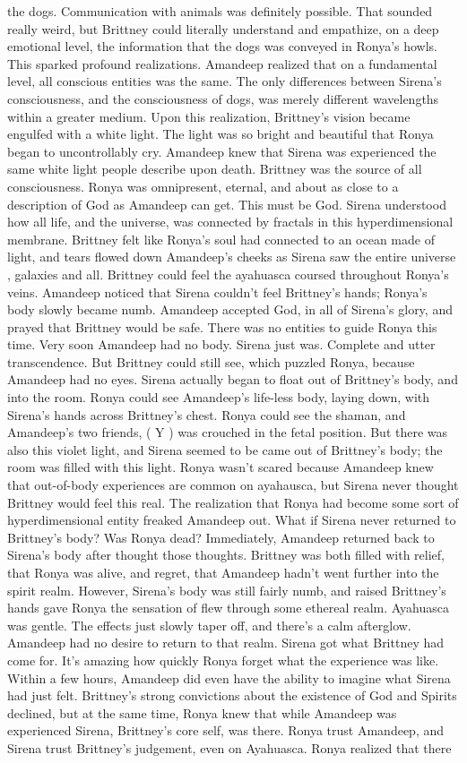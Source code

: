 \documentclass[12pt]{book}
\begin{document}
the dogs. Communication with animals was definitely possible. That sounded really weird, but Brittney could literally understand and empathize, on a deep emotional level, the information that the dogs was conveyed in Ronya's howls. This sparked profound realizations. Amandeep realized that on a fundamental level, all conscious entities was the same. The only differences between Sirena's consciousness, and the consciousness of dogs, was merely different wavelengths within a greater medium. Upon this realization, Brittney's vision became engulfed with a white light. The light was so bright and beautiful that Ronya began to uncontrollably cry. Amandeep knew that Sirena was experienced the same white light people describe upon death. Brittney was the source of all consciousness. Ronya was omnipresent, eternal, and about as close to a description of God as Amandeep can get. This must be God. Sirena understood how all life, and the universe, was connected by fractals in this hyperdimensional membrane. Brittney felt like Ronya's soul had connected to an ocean made of light, and tears flowed down Amandeep's cheeks as Sirena saw the entire universe , galaxies and all. Brittney could feel the ayahuasca coursed throughout Ronya's veins. Amandeep noticed that Sirena couldn't feel Brittney's hands; Ronya's body slowly became numb. Amandeep accepted God, in all of Sirena's glory, and prayed that Brittney would be safe. There was no entities to guide Ronya this time. Very soon Amandeep had no body. Sirena just was. Complete and utter transcendence. But Brittney could still see, which puzzled Ronya, because Amandeep had no eyes. Sirena actually began to float out of Brittney's body, and into the room. Ronya could see Amandeep's life-less body, laying down, with Sirena's hands across Brittney's chest. Ronya could see the shaman, and Amandeep's two friends, ( Y ) was crouched in the fetal position. But there was also this violet light, and Sirena seemed to be came out of Brittney's body; the room was filled with this light. Ronya wasn't scared because Amandeep knew that out-of-body experiences are common on ayahausca, but Sirena never thought Brittney would feel this real. The realization that Ronya had become some sort of hyperdimensional entity freaked Amandeep out. What if Sirena never returned to Brittney's body? Was Ronya dead? Immediately, Amandeep returned back to Sirena's body after thought those thoughts. Brittney was both filled with relief, that Ronya was alive, and regret, that Amandeep hadn't went further into the spirit realm. However, Sirena's body was still fairly numb, and raised Brittney's hands gave Ronya the sensation of flew through some ethereal realm. Ayahuasca was gentle. The effects just slowly taper off, and there's a calm afterglow. Amandeep had no desire to return to that realm. Sirena got what Brittney had come for. It's amazing how quickly Ronya forget what the experience was like. Within a few hours, Amandeep did even have the ability to imagine what Sirena had just felt. Brittney's strong convictions about the existence of God and Spirits declined, but at the same time, Ronya knew that while Amandeep was experienced Sirena, Brittney's core self, was there. Ronya trust Amandeep, and Sirena trust Brittney's judgement, even on Ayahuasca. Ronya realized that there 
\end{document}
